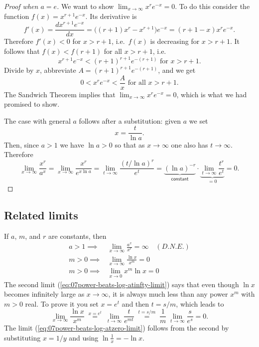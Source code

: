 \begin{proof}[Proof when $a=e$]
  We want to show $\lim_{x\to\infty} x^re^{-x} = 0$.  To do this consider the
  function $f(x) = x^{r+1}e^{-x}$.  Its derivative is
  \[
  f'(x) = \frac{dx^{r+1}e^{-x}}{dx}
  = \bigl((r+1)x^r - x^{r+1}\bigr)e^{-x}
  = (r+1-x)x^re^{-x}.
  \]
  Therefore $f'(x) < 0$ for $x>r+1$, i.e.\ $f(x)$ is decreasing for $x>r+1$.
  It follows that $f(x) <f(r+1)$ for all $x>r+1$, i.e.
  \[
  x^{r+1}e^{-x} < (r+1)^{r+1}e^{-(r+1)}\text{ for } x>r+1.
  \]
  Divide by $x$, abbreviate $A=(r+1)^{r+1}e^{-(r+1)}$, and we get
  \[
  0<x^re^{-x}<\frac Ax \text{ for all }x>r+1.
  \]
  The Sandwich Theorem implies that $\lim_{x\to\infty} x^re^{-x} = 0$, which
  is what we had promised to show.

The case with general $a$ follows after a substitution:  given $a$ we set 
\[
 x=\frac{t}{\ln a}. 
\]
Then, since $a>1$ we have $\ln a>0$ so that as $x\to\infty$ one also has $t\to\infty$.  Therefore
\[
 \lim_{x\to\infty}
 \frac{x^r}{a^x}
 = 
 \lim_{x\to\infty}
 \frac{x^r}{e^{x\ln a}}
 = 
 \lim_{t\to\infty}
 \frac{(t/\ln a)^r}{e^{t}}
 = \underbrace{(\ln a)^{-r}}_{\textsf{constant}}\cdot 
 \underbrace{\lim_{t\to\infty}
 \frac{t^r}{e^{t}}}_{=0}
 =0.
\]


\end{proof}




\subsection{Related limits} %
If $a$, $m$, and $r$ are constants, then
\begin{subequations}
  \begin{align}
    a>1 \implies &
    \lim_{x \to\infty} \frac{a^x}{x^r} = \infty \quad(D.N.E.)
    \label{eq:07exp-beats-power-limit}\\
    m>0 \implies & \lim_{x \to\infty} \frac{\ln x}{x^m} =0
        \label{eq:07power-beats-log-atinfty-limit}\\
    m>0 \implies & \lim_{x \to 0} x^m\ln x =0
        \label{eq:07power-beats-log-atzero-limit}
  \end{align}
\end{subequations}
The second limit (\ref{eq:07power-beats-log-atinfty-limit}) says that even
though $\ln x$ becomes infinitely large as $x \to\infty$, it is always much less
than any power $x^m$ with $m>0$ real.  To prove it you set $x=e^t$ and then
$t=s/m$, which leads to
\[
\lim_{x \to\infty} \frac{\ln x}{x^m}
\;\stackrel{x=e^t}{=}\;
\lim_{t \to\infty} \frac{t}{e^{mt}}
\;\stackrel{t = s/m}{=}\;
\frac1m\;\lim_{t \to\infty}\frac{s}{e^s} = 0.
\]
The limit (\ref{eq:07power-beats-log-atzero-limit}) follows from the second by
substituting $x=1/y$ and using $\ln\frac1x = -\ln x$.




